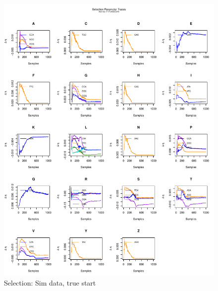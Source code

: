 \documentclass[11pt]{labbook}
\begin{document}
    \begin{figure}
        \centering
        \includegraphics[scale=.65]{FONSE_Plots/2016/October_17/simulated_true_sel}
        \caption{Selection: Sim data, true start}
        \label{fig:OCT17_S.T.SEL}
    \end{figure}
\end{document}
